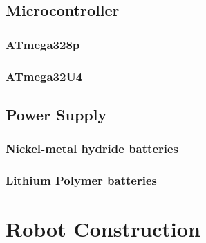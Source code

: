 \documentclass[11pt,a4paper]{article}
\begin{document}
\subsection{Microcontroller}

\subsubsection{ATmega328p}
\subsubsection{ATmega32U4}

\subsection{Power Supply}
\subsubsection{Nickel-metal hydride batteries}
\subsubsection{Lithium Polymer batteries}

\section{Robot Construction}



\nocite{*}
\printbibliography
{}
\end{document}
